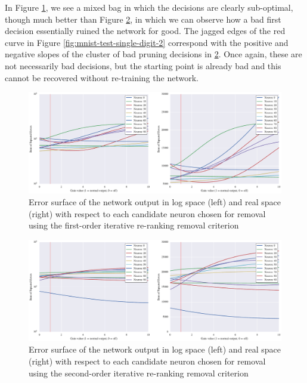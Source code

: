 In Figure \ref{fig:mnist-test-single-digit-2-g1}, we see a mixed bag in which the decisions are clearly sub-optimal, though much better than Figure \ref{fig:mnist-test-single-digit-2-g2}, in which we can observe how a bad first decision essentially ruined the network for good. The jagged edges of the red curve in Figure \ref{fig:mnist-test-single-digit-2} correspond with the positive and negative slopes of the cluster of bad pruning decisions in \ref{fig:mnist-test-single-digit-2-g2}. Once again, these are not necessarily bad decisions, but the starting point is already bad and this cannot be recovered without re-training the network. 

\begin{figure}[!ht]
\centering
\includegraphics[width=\linewidth]{png/mnist-test-single-digit-2-g1.pdf}
\caption{Error surface of the network output in log space (left) and real space (right) with respect to each candidate neuron chosen for removal using the first-order iterative re-ranking removal criterion}
\label{fig:mnist-test-single-digit-2-g1}
\end{figure}

\begin{figure}[!ht]
\centering
\includegraphics[width=\linewidth]{png/mnist-test-single-digit-2-g2.pdf}
\caption{Error surface of the network output in log space (left) and real space (right) with respect to each candidate neuron chosen for removal using the second-order iterative re-ranking removal criterion}
\label{fig:mnist-test-single-digit-2-g2}
\end{figure}

